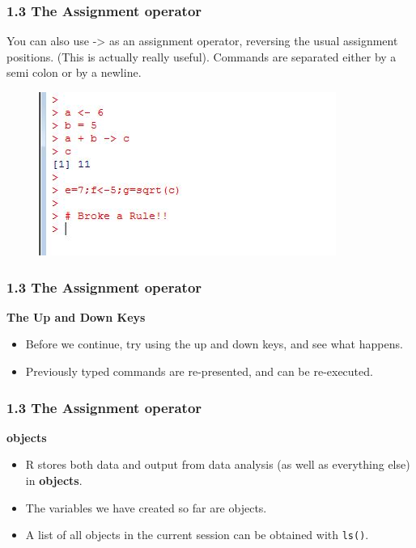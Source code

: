 \documentclass{beamer}
\begin{document}
 	\begin{frame}
 		\frametitle{1.3 The Assignment operator}
 		
 		You can also use -> as an assignment operator, reversing the
 		usual assignment positions. (This is actually really useful). Commands are separated either by
 		a semi colon or by a newline.
 		\begin{figure}
 			\centering
 			\includegraphics[width=1.2\linewidth]{images/assignment}
 		\end{figure}
 		
 	\end{frame}
 	
 	\begin{frame}
 		\frametitle{1.3 The Assignment operator}
 		\textbf{The Up and Down Keys}
 		\begin{itemize}
 			\item Before we continue, try using the up and down keys, and see what happens. 
 			\item Previously
 			typed commands are re-presented, and can be re-executed.
 		\end{itemize}
 		
 	\end{frame}
 	\begin{frame}
 		\frametitle{1.3 The Assignment operator }
 		\textbf{objects}
 		\begin{itemize}
 			\item R stores both data and output from data analysis (as well as everything else) in \textbf{objects}.
 			\item The variables we have created so far are objects. 
 			\item A list of all objects in the current session can
 			be obtained with \texttt{ls()}.
 		\end{itemize}
 	\end{frame}
 	
\end{document}

